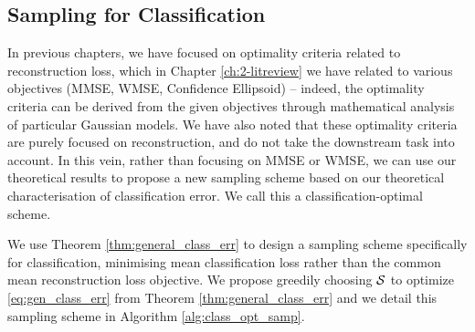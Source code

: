 
\subsection{Sampling for Classification}
\label{sec:optimal_sampling_design}
In previous chapters, we have focused on optimality criteria related to reconstruction loss, which in Chapter \ref{ch:2-litreview} we have related to various objectives (MMSE, WMSE, Confidence Ellipsoid) -- indeed, the optimality criteria can be derived from the given objectives through mathematical analysis of particular Gaussian models. We have also noted that these optimality criteria are purely focused on reconstruction, and do not take the downstream task into account. In this vein, rather than focusing on MMSE or WMSE, we can use our theoretical results to propose a new sampling scheme based on our theoretical characterisation of classification error. We call this a classification-optimal scheme.

We use Theorem \ref{thm:general_class_err} to design a sampling scheme specifically for classification, minimising mean classification loss rather than the common mean reconstruction loss objective. We propose greedily choosing $\mathcal{S}$ to optimize \eqref{eq:gen_class_err} from Theorem \ref{thm:general_class_err} and we detail this sampling scheme in Algorithm \ref{alg:class_opt_samp}.

